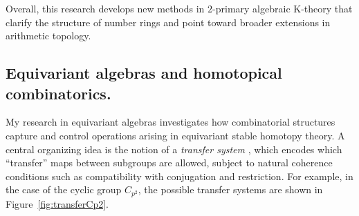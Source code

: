 \documentclass[11pt]{article}
\begin{document}
Overall, this research develops new methods in $2$-primary algebraic K-theory that clarify the structure of number rings and point toward broader extensions in arithmetic topology.

\subsection{Equivariant algebras and homotopical combinatorics.}
My research in equivariant algebras investigates how combinatorial structures capture and control  operations arising in equivariant stable homotopy theory.
A central organizing idea is the notion of a {\it transfer system} \cite{MR4244201}, which encodes which “transfer” maps between subgroups are allowed, subject to natural coherence conditions such as compatibility with conjugation and restriction.
For example, in the case of the cyclic group $C_{p^2}$, the possible transfer systems are shown in Figure~\ref{fig:transferCp2}.
\end{document}
